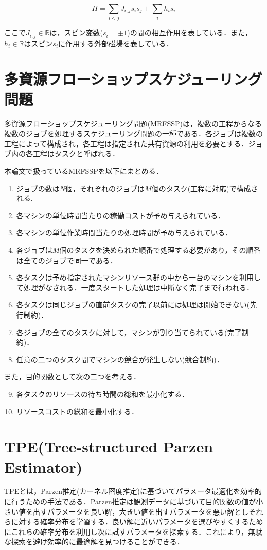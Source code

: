 \begin{equation}
H = \sum_{i < j}J_{i,j} s_i s_j + \sum_i h_i s_i
\label{eq:ising_model}
\end{equation}

ここで$J_{i,j}\in \mathbb{R}$は，スピン変数($s_i = \pm 1$)の間の相互作用を表している．また，$h_{i}\in \mathbb{R}$はスピン$s_i$に作用する外部磁場を表している．

\section{多資源フローショップスケジューリング問題}
多資源フローショップスケジューリング問題(MRFSSP)は，複数の工程からなる複数のジョブを処理するスケジューリング問題の一種である\cite{nouri}．各ジョブは複数の工程によって構成され，各工程は指定された共有資源の利用を必要とする．ジョブ内の各工程はタスクと呼ばれる．

本論文で扱っているMRFSSPを以下にまとめる．

\begin{enumerate} 
\item ジョブの数は$N$個，それぞれのジョブは$M$個のタスク(工程に対応)で構成される. 
\item 各マシンの単位時間当たりの稼働コストが予め与えられている．
\item 各マシンの単位作業時間当たりの処理時間が予め与えられている．
\item 各ジョブは$M$個のタスクを決められた順番で処理する必要があり，その順番は全てのジョブで同一である．
\item 各タスクは予め指定されたマシンリソース群の中から一台のマシンを利用して処理がなされる．一度スタートした処理は中断なく完了まで行われる．
\item 各タスクは同じジョブの直前タスクの完了以前には処理は開始できない(先行制約)．
\item 各ジョブの全てのタスクに対して，マシンが割り当てられている(完了制約)．
\item 任意の二つのタスク間でマシンの競合が発生しない(競合制約)．
\end{enumerate}

また，目的関数として次の二つを考える．
\begin{enumerate} 
\setcounter{enumi}{8} 
\item 各タスクのリソースの待ち時間の総和を最小化する．
\item リソースコストの総和を最小化する．
\end{enumerate}

\section{TPE(Tree-structured Parzen Estimator)}
TPEとは，Parzen推定(カーネル密度推定)に基づいてパラメータ最適化を効率的に行うための手法である．Parzen推定は観測データに基づいて目的関数の値が小さい値を出すパラメータを良い解，大きい値を出すパラメータを悪い解としそれらに対する確率分布を学習する．良い解に近いパラメータを選びやすくするためにこれらの確率分布を利用し次に試すパラメータを探索する\cite{osaka}．これにより，無駄な探索を避け効率的に最適解を見つけることができる\cite{james}．
